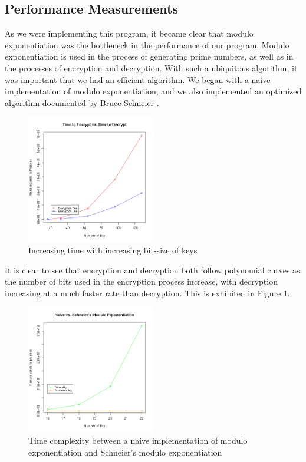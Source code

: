 \documentclass[11pt,technote]{IEEEtran}
\begin{document}
\subsection{Performance Measurements}
\par As we were implementing this program, it became clear that modulo
exponentiation was the bottleneck in the performance of our program. Modulo
exponentiation is used in the process of generating prime numbers, as well as in
the processes of encryption and decryption. With such a ubiquitous algorithm, it
was important that we had an efficient algorithm. We began with a naive
implementation of modulo exponentiation, and we also implemented an optimized
algorithm documented by Bruce Schneier \cite{sonsec}.
\begin{figure}
	\begin{center}
		\includegraphics[width=0.5\textwidth]{cryptimes}
		\caption{Increasing time with increasing bit-size of keys}
	\end{center}
\end{figure}
\par It is clear to see that encryption and decryption both follow polynomial
curves as the number of bits used in the encryption process increase, with
decryption increasing at a much faster rate than decryption. This is exhibited
in Figure 1.
\begin{figure}
	\begin{center}
		\includegraphics[width=0.5\textwidth]{modexp}
		\caption{Time complexity between a naive implementation of modulo
		exponentiation and Schneier's modulo exponentiation\cite{sonsec}}
	\end{center}
\end{figure}
\end{document}
